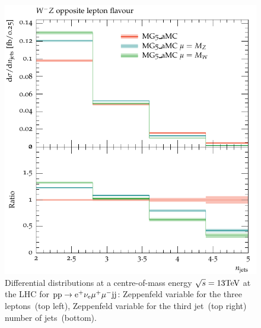 \documentclass[11pt]{cernrep}
\begin{document}
\begin{figure}[htbp]
\begin{center}
   \includegraphics[scale=0.5]{figs/MG_WmZ_OF_nJets}
\caption{Differential distributions at a centre-of-mass energy $\sqrt{s}=13{\rm TeV}$ at the LHC for ${\rm p} {\rm p} \to {\rm e}^+  \nu_{\rm e}  \mu^+ \mu^- {\rm j} {\rm j}$: 
                Zeppenfeld variable for the three leptons~(top left),
                Zeppenfeld variable for the third jet~(top right)
                number of jets~(bottom).}
\label{vbs_fig_shower_2b}
\end{center}
\end{figure}
\end{document}
